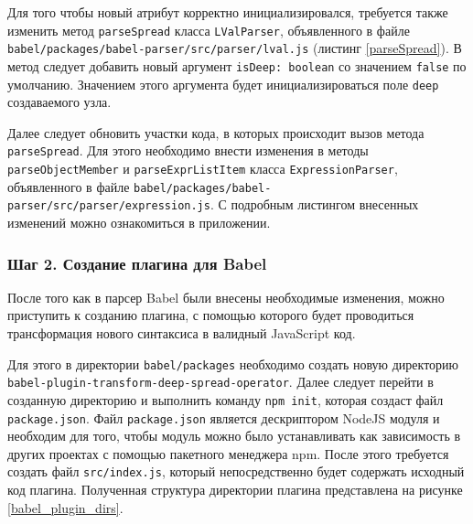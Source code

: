 \documentclass[14pt, a4paper]{article}
\def\code#1{\texttt{#1}} %
\begin{document}
Для того чтобы новый атрибут корректно инициализировался, требуется также изменить метод \code{parseSpread} класса
\code{LValParser}, объявленного в файле \code{babel/packages/babel-parser/src/parser/lval.js} (листинг \ref{parseSpread}). 
В метод следует добавить новый аргумент \code{isDeep: boolean} со значением \code{false} по умолчанию.
Значением этого аргумента будет инициализироваться поле \code{deep} создаваемого узла.



Далее следует обновить участки кода, в которых происходит вызов метода \code{parseSpread}. Для этого
необходимо внести изменения в методы \code{parseObjectMember} и \code{parseExprListItem} класса \code{ExpressionParser},
объявленного в файле \code{babel/packages/babel-parser/src/parser/expression.js}.
С подробным листингом внесенных изменений можно ознакомиться в приложении.


\subsubsection*{Шаг 2. Создание плагина для Babel}
После того как в парсер Babel были внесены необходимые изменения, можно приступить к созданию плагина,
с помощью которого будет проводиться трансформация нового синтаксиса в валидный JavaScript код.

Для этого в директории \code{babel/packages} необходимо создать новую директорию \code{babel-plugin-transform-deep-spread-operator}.
Далее следует перейти в созданную директорию и выполнить команду \code{npm init}, которая создаст
файл \code{package.json}. Файл \code{package.json} является дескриптором NodeJS модуля и необходим 
для того, чтобы модуль можно было устанавливать как зависимость в других проектах с помощью пакетного
менеджера npm. После этого требуется создать файл \code{src/index.js}, который непосредственно будет 
содержать исходный код плагина. Полученная структура директории плагина представлена на рисунке \ref{babel_plugin_dirs}.

\end{document}
